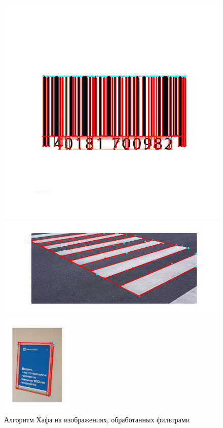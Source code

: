 \documentclass[a4paper,12pt]{article}
\begin{document}
\begin{figure}[H]
    \centering
    \begin{minipage}{0.48\textwidth}
        \centering
        \includegraphics[width=\textwidth]{images/hough_lines/1_proc_hough_lines.png}
    \end{minipage}
    \begin{minipage}{0.48\textwidth}
        \centering
        \includegraphics[width=\textwidth]{images/hough_lines/2_proc_hough_lines.png}
    \end{minipage}
    \includegraphics[width=0.3\textwidth]{images/hough_lines/3_proc_hough_lines.png}
    \caption{Алгоритм Хафа на изображениях, обработанных фильтрами}
\end{figure}
\end{document}
